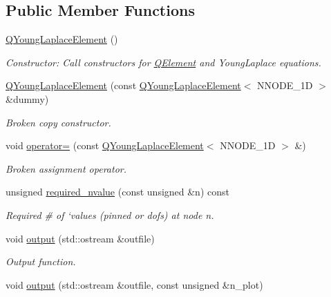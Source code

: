 \subsection*{Public Member Functions}
\begin{DoxyCompactItemize}
\item 
\hyperlink{classoomph_1_1QYoungLaplaceElement_a055701cd6bf5e26c96e8ef560309dbb4}{Q\+Young\+Laplace\+Element} ()
\begin{DoxyCompactList}\small\item\em Constructor\+: Call constructors for \hyperlink{classoomph_1_1QElement}{Q\+Element} and Young\+Laplace equations. \end{DoxyCompactList}\item 
\hyperlink{classoomph_1_1QYoungLaplaceElement_a489e0095ed071e89f6e12ad4f76502e8}{Q\+Young\+Laplace\+Element} (const \hyperlink{classoomph_1_1QYoungLaplaceElement}{Q\+Young\+Laplace\+Element}$<$ N\+N\+O\+D\+E\+\_\+1D $>$ \&dummy)
\begin{DoxyCompactList}\small\item\em Broken copy constructor. \end{DoxyCompactList}\item 
void \hyperlink{classoomph_1_1QYoungLaplaceElement_ab0a071ddac3ee5e94971db3c13877b64}{operator=} (const \hyperlink{classoomph_1_1QYoungLaplaceElement}{Q\+Young\+Laplace\+Element}$<$ N\+N\+O\+D\+E\+\_\+1D $>$ \&)
\begin{DoxyCompactList}\small\item\em Broken assignment operator. \end{DoxyCompactList}\item 
unsigned \hyperlink{classoomph_1_1QYoungLaplaceElement_ab7ff7b786f99d3844d795b61ee7cf852}{required\+\_\+nvalue} (const unsigned \&n) const
\begin{DoxyCompactList}\small\item\em Required \# of `values\textquotesingle{} (pinned or dofs) at node n. \end{DoxyCompactList}\item 
void \hyperlink{classoomph_1_1QYoungLaplaceElement_acd3dd1655fe2b9fd060a15ab9116eeae}{output} (std\+::ostream \&outfile)
\begin{DoxyCompactList}\small\item\em Output function. \end{DoxyCompactList}\item 
void \hyperlink{classoomph_1_1QYoungLaplaceElement_a4cbc12fd3e2e37de4985d00f6eed5a14}{output} (std\+::ostream \&outfile, const unsigned \&n\+\_\+plot)

\end{DoxyCompactItemize}
